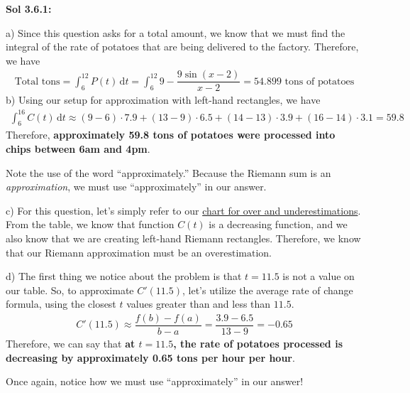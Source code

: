 \begin{tcolorbox}[solution]
    \textbf{Sol 3.6.1: } \par
    a) Since this question asks for a total amount, we know that we must find the integral of the rate of potatoes that are being delivered to the factory. Therefore, we have \begin{align*}
        \text{Total tons} = \int_6^{12} P(t) \,\mathrm{d}t = \int_6^{12} 9 - \dfrac{9\sin(x - 2)}{x - 2} = \boxed{54.899 \text{ tons of potatoes}}
    \end{align*}
    b) Using our setup for approximation with left-hand rectangles, we have \begin{align*}
        \int_6^{16} C(t) \,\mathrm{d}t \approx (9 - 6) \cdot 7.9 + (13 - 9) \cdot 6.5 + (14 - 13) \cdot 3.9 + (16 - 14) \cdot 3.1 = 59.8
    \end{align*}
    Therefore, \textbf{approximately 59.8 tons of potatoes were processed into chips between 6am and 4pm}. \par
    \begin{tcolorbox}[interesting]
        Note the use of the word ``approximately.'' Because the Riemann sum is an \textit{approximation}, we must use ``approximately'' in our answer.
    \end{tcolorbox} \vspace{5.5pt}
    c) For this question, let's simply refer to our \hyperlink{chart for over and underestimations}{chart for over and underestimations}. From the table, we know that function $C(t)$ is a decreasing function, and we also know that we are creating left-hand Riemann rectangles. Therefore, we know that our Riemann approximation must be an $\boxed{\text{overestimation}}$. \par
    \vspace{11pt}
    d) The first thing we notice about the problem is that $t = 11.5$ is not a value on our table. So, to approximate $C'(11.5)$, let's utilize the average rate of change formula, using the closest $t$ values greater than and less than $11.5$. \begin{align*}
        C'(11.5) \approx \dfrac{f(b) - f(a)}{b - a} = \dfrac{3.9 - 6.5}{13 - 9} = -0.65
    \end{align*}
    Therefore, we can say that \textbf{at $t = 11.5$, the rate of potatoes processed is decreasing by approximately 0.65 tons per hour per hour}. \par
    \begin{tcolorbox}[interesting]
        Once again, notice how we must use ``approximately'' in our answer!

\end{tcolorbox}
\end{tcolorbox}

